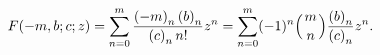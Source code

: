 \[\mathop{F\/}\nolimits\!\left(-m,b;c;z\right)=\sum_{n=0}^{m}\frac{\left(-m%
\right)_{n}\left(b\right)_{n}}{\left(c\right)_{n}n!}z^{n}=\sum_{n=0}^{m}(-1)^{%
n}{\left({{m}\atop{n}}\right)}\frac{\left(b\right)_{n}}{\left(c\right)_{n}}z^{%
n}.\]